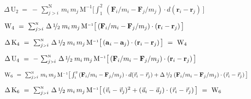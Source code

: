 \documentclass[10pt]{article}
\newcommand{\med}{\raise.5ex\hbox{$\scriptstyle 1$}\kern-.15em/\kern-.09em\lower.25ex\hbox{$\scriptstyle 2$}}
\begin{document}
\par \bigskip\smallskip \noindent $\Delta \, {\mathrm{U}}_2 ~=~ - \, \sum_{j{\scriptscriptstyle >}i}^{\scriptscriptstyle{\mathrm{N}}} \, m_i \, m_j \, {\mathrm{M}}^{\scriptscriptstyle -1} \big [ \int_{\scriptscriptstyle 1}^{\scriptscriptstyle 2} \, ({\mathbf{F}}_i / m_i - {\mathbf{F}}_j / m_j) \cdot d({\mathbf{r}}_{i} - {\mathbf{r}}_{j}) \, \big ]$

\par \bigskip\bigskip \noindent ${\mathrm{W}}_4 ~=~ \sum_{j{\scriptscriptstyle >}i}^{\scriptscriptstyle{\mathrm{N}}} \, \Delta \, \med \; m_i \, m_j \, {\mathrm{M}}^{\scriptscriptstyle -1} \big [ \, ({\mathbf{F}}_i / m_i - {\mathbf{F}}_j / m_j) \cdot ({\mathbf{r}}_{i} - {\mathbf{r}}_{j}) \, \big ]$

\par \bigskip\smallskip \noindent $\Delta \, {\mathrm{K}}_4 ~=~ \sum_{j{\scriptscriptstyle >}i}^{\scriptscriptstyle{\mathrm{N}}} \, \Delta \, \med \; m_i \, m_j \, {\mathrm{M}}^{\scriptscriptstyle -1} \big [ \, ({\mathbf{a}}_{\hspace{+0.045em}i} - {\mathbf{a}}_{j}) \cdot ({\mathbf{r}}_{i} - {\mathbf{r}}_{j}) \, \big ] ~=~ {\mathrm{W}}_4$

\par \bigskip\smallskip \noindent $\Delta \, {\mathrm{U}}_4 ~=~ - \, \sum_{j{\scriptscriptstyle >}i}^{\scriptscriptstyle{\mathrm{N}}} \, \Delta \, \med \; m_i \, m_j \, {\mathrm{M}}^{\scriptscriptstyle -1} \big [ \, ({\mathbf{F}}_i / m_i - {\mathbf{F}}_j / m_j) \cdot ({\mathbf{r}}_{i} - {\mathbf{r}}_{j}) \, \big ]$

\par \bigskip\bigskip \noindent ${\mathrm{W}}_6 ~=~ \sum_{j{\scriptscriptstyle >}i}^{\scriptscriptstyle{\mathrm{N}}} \, m_i \, m_j \, {\mathrm{M}}^{\scriptscriptstyle -1} \big [ \int_{\scriptscriptstyle 1}^{\scriptscriptstyle 2} \, ({\mathbf{F}}_i / m_i - {\mathbf{F}}_j / m_j) \cdot d({\vec{\mathit{r}}_{i}} - {\vec{\mathit{r}}_{j}}) + \Delta \, \med \; ({\mathbf{F}}_i / m_i - {\mathbf{F}}_j / m_j) \cdot ({\vec{\mathit{r}}_{i}} - {\vec{\mathit{r}}_{j}}) \, \big ]$

\par \bigskip\smallskip \noindent $\Delta \, {\mathrm{K}}_6 ~=~ \sum_{j{\scriptscriptstyle >}i}^{\scriptscriptstyle{\mathrm{N}}} \, \Delta \, \med \; m_i \, m_j \, {\mathrm{M}}^{\scriptscriptstyle -1} \big [ \, ({\vec{\mathit{v}}_{i}} - {\vec{\mathit{v}}_{j}})^2 + ({\vec{\mathit{a}}_{i}} - {\vec{\mathit{a}}_{j}}) \cdot ({\vec{\mathit{r}}_{i}} - {\vec{\mathit{r}}_{j}}) \, \big ] ~=~ {\mathrm{W}}_6$
\end{document}
